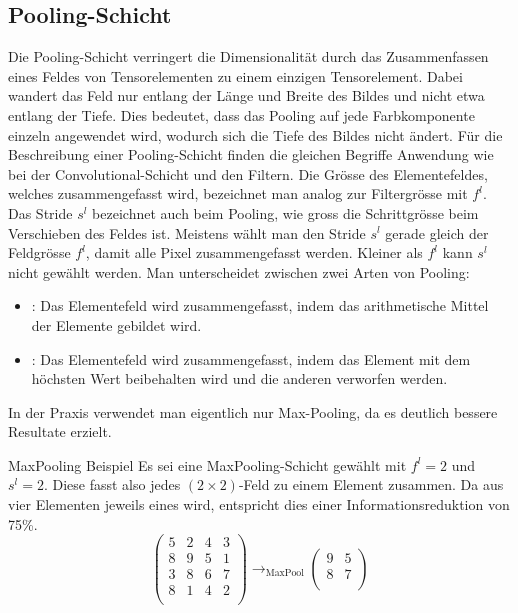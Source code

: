 \subsection{Pooling-Schicht}
Die Pooling-Schicht verringert die Dimensionalität durch das Zusammenfassen eines Feldes
von Tensorelementen zu einem einzigen Tensorelement.
Dabei wandert das Feld nur entlang der Länge und Breite des Bildes und
nicht etwa entlang der Tiefe. Dies bedeutet, dass das Pooling auf jede Farbkomponente
einzeln angewendet wird, wodurch sich die Tiefe des Bildes nicht ändert.
\para{}
Für die Beschreibung einer Pooling-Schicht finden die gleichen Begriffe
Anwendung wie bei der Convolutional-Schicht und den Filtern.
Die Grösse des Elementefeldes, welches zusammengefasst wird, bezeichnet man analog zur
Filtergrösse mit $f^l$. Das Stride $s^l$ bezeichnet auch beim Pooling, wie
gross die Schrittgrösse beim Verschieben des Feldes ist. Meistens wählt man den
Stride $s^l$ gerade gleich der Feldgrösse $f^l$, damit alle Pixel
zusammengefasst werden. Kleiner als $f^l$ kann $s^l$ nicht gewählt werden.
\para{}
Man unterscheidet zwischen zwei Arten von Pooling:
\begin{itemize}
\item{: Das Elementefeld wird zusammengefasst, indem
    das arithmetische Mittel der Elemente gebildet wird.}
\item{: Das Elementefeld wird zusammengefasst, indem das
    Element mit dem höchsten Wert beibehalten wird und die anderen verworfen werden.}
\end{itemize}
In der Praxis verwendet man eigentlich nur Max-Pooling, da es deutlich bessere
Resultate erzielt.
\para{}
\begin{examplebox}{MaxPooling Beispiel}
  Es sei eine MaxPooling-Schicht gewählt mit $f^l = 2$ und $s^l = 2$.
  Diese fasst also jedes $(2 \times 2)$-Feld zu einem Element zusammen. Da aus
  vier Elementen jeweils eines wird, entspricht dies einer Informationsreduktion
  von 75\%.
  \para{}
  \begin{equation*}
    \begin{pmatrix}
      5 & 2 & 4 & 3 \\
      8 & 9 & 5 & 1 \\
      3 & 8 & 6 & 7 \\
      8 & 1 & 4 & 2 \\
    \end{pmatrix}
    \to_{\text{MaxPool}}
    \begin{pmatrix}
      9 & 5 \\
      8 & 7 \\
    \end{pmatrix}
  \end{equation*}
\end{examplebox}
